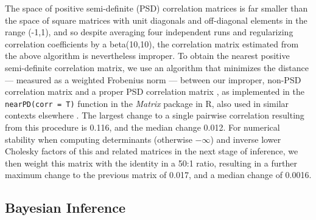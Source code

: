 The space of positive semi-definite (PSD) correlation matrices is far smaller than the space of square matrices with unit diagonals and off-diagonal elements in the range (-1,1), and so despite averaging four independent runs and regularizing correlation coefficients by a beta(10,10), the correlation matrix estimated from the above algorithm is nevertheless improper. To obtain the nearest positive semi-definite correlation matrix, we use an algorithm that minimizes the distance --- measured as a weighted Frobenius norm --- between our improper, non-PSD correlation matrix and a proper PSD correlation matrix \citep{highamComputingNearestCorrelation2002}, as implemented in the \texttt{nearPD(corr = T)} function in the \textit{Matrix} package \citep{batesPackageMatrix2019} in R, also used in similar contexts elsewhere \citep{blowsPhenomewideDistributionGenetic2015}. The largest change to a single pairwise correlation resulting from this procedure is 0.116, and the median change 0.012.  For numerical stability when computing determinants (otherwise $-\infty$) and inverse lower Cholesky factors of this and related matrices in the next stage of inference, we then weight this matrix with the identity in a 50:1 ratio, resulting in a further maximum change to the previous matrix of 0.017, and a median change of 0.0016. 

\subsection{Bayesian Inference}

